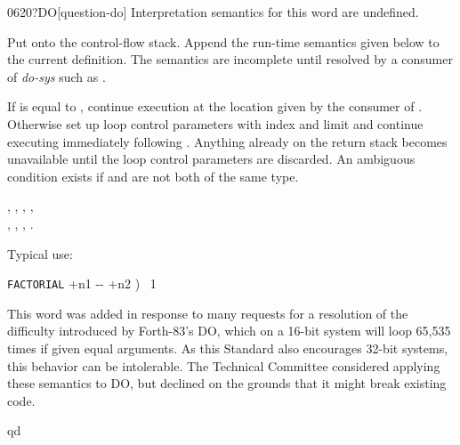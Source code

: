 \begin{worddef}[qDO]{0620}{?DO}[question-do]
\interpret
	Interpretation semantics for this word are undefined.

\compile

	Put  onto the control-flow stack. Append the
	run-time semantics given below to the current definition. The
	semantics are incomplete until resolved by a consumer of
	\emph{do-sys} such as .

\runtime

	If  is equal to , continue
	execution at the location given by the consumer of
	. Otherwise set up loop control parameters with
	index  and limit  and continue
	executing immediately following . Anything already
	on the return stack becomes unavailable until the loop
	control parameters are discarded. An ambiguous condition
	exists if  and  are not both of
	the same type.

\see {},
	,
	,
	, \\
	,
	,
	,
	.

	\begin{rationale} %
		Typical use:

		\tab \word{:} \texttt{FACTORIAL}  +n1 -{}- +n2 )~
			1   ~
				 \word{*}~
		\word{;}

		This word was added in response to many requests for a
		resolution of the difficulty introduced by Forth-83's DO,
		which on a 16-bit system will loop 65,535 times if given
		equal arguments. As this Standard also encourages 32-bit
		systems, this behavior can be intolerable. The Technical
		Committee considered applying these semantics to DO, but
		declined on the grounds that it might break existing code.
	\end{rationale}

	\begin{testing}\ttfamily

	\word{:} qd    \word{;} \\
	 \\
	 \\


\end{testing}
\end{worddef}
